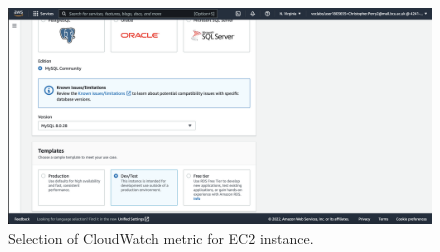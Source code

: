 \begin{figure}[!htbp]
    \centering
    \includegraphics[width=\textwidth]{resources/rds/rds-templates.png}
    \caption{Selection of CloudWatch metric for EC2 instance.}
    \label{fig:rds-templates}
\end{figure}